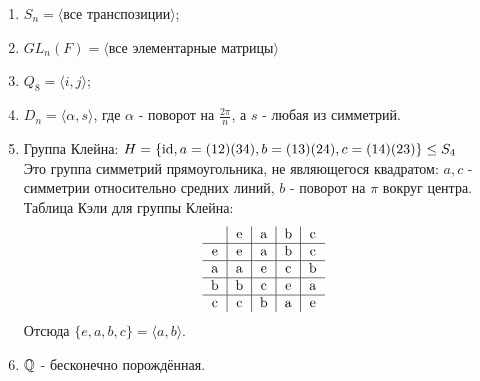 \begin{examples} \tab
    \begin{enumerate}
        \item $S_n = \langle \text{все транспозиции} \rangle$;
        \item $GL_n(F) = \langle \text{все элементарные матрицы} \rangle$
        \item $Q_8 = \langle i, j \rangle$;
        \item $D_n = \langle \alpha, s\rangle$, где $\alpha$ - поворот на $\frac{2\pi}{n}$, а $s$ - любая из симметрий.
        \item Группа Клейна: $H = \{\textup{id}, a=(12)(34), b=(13)(24), c=(14)(23)\} \leq S_4$\\
        Это группа симметрий прямоугольника, не являющегося квадратом: $a, c$ - симметрии относительно средних линий, $b$ - поворот на $\pi$ вокруг центра. 
        Таблица Кэли для группы Клейна:
        $$\begin{tabular}{c|c|c|c|c}
        \null & e & a & b & c \\ \hline
        e & e & a & b & c \\ \hline
        a & a & e & c & b \\ \hline
        b & b & c & e & a \\ \hline
        c & c & b & a & e
        \end{tabular}$$ 
        Отсюда $\{e, a, b, c\} = \langle a, b \rangle$.
        \item $\mathbb{Q}$ - бесконечно порождённая.
    \end{enumerate}
\end{examples}
